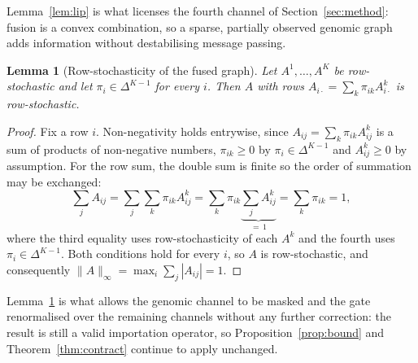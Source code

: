 \documentclass[conference]{IEEEtran}
\newtheorem{lemma}{Lemma}
\begin{document}
Lemma~\ref{lem:lip} is what licenses the fourth channel of Section~\ref{sec:method}: fusion is a convex combination, so a sparse, partially observed genomic graph adds information without destabilising message passing.


\begin{lemma}[Row-stochasticity of the fused graph]\label{lem:rowstoch}
Let $A^{1},\dots,A^{K}$ be row-stochastic and let $\pi_i\in\Delta^{K-1}$ for every $i$. Then $A$ with rows $A_{i\cdot}=\sum_k \pi_{ik}A^{k}_{i\cdot}$ is row-stochastic.
\end{lemma}
\begin{proof}
Fix a row $i$. Non-negativity holds entrywise, since $A_{ij}=\sum_k\pi_{ik}A^{k}_{ij}$ is a sum of products of non-negative numbers, $\pi_{ik}\ge0$ by $\pi_i\in\Delta^{K-1}$ and $A^{k}_{ij}\ge0$ by assumption. For the row sum, the double sum is finite so the order of summation may be exchanged:
\begin{equation}
\sum_{j} A_{ij}
=\sum_{j}\sum_{k}\pi_{ik}A^{k}_{ij}
=\sum_{k}\pi_{ik}\underbrace{\sum_{j}A^{k}_{ij}}_{=\,1}
=\sum_{k}\pi_{ik}=1 ,
\end{equation}
where the third equality uses row-stochasticity of each $A^{k}$ and the fourth uses $\pi_i\in\Delta^{K-1}$. Both conditions hold for every $i$, so $A$ is row-stochastic, and consequently $\|A\|_\infty=\max_i\sum_j|A_{ij}|=1$.
\end{proof}

Lemma~\ref{lem:rowstoch} is what allows the genomic channel to be masked and the gate renormalised over the remaining channels without any further correction: the result is still a valid importation operator, so Proposition~\ref{prop:bound} and Theorem~\ref{thm:contract} continue to apply unchanged.
\end{document}
